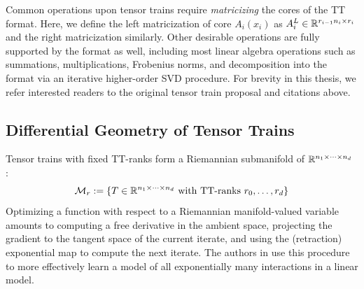 Common operations upon tensor trains require \textit{matricizing} the cores of the TT format. Here, we define the left matricization of core $A_i(x_i)$ as $A_i^L \in \mathbb{R}^{r_{i-1}n_i \times r_i} $ and the right matricization similarly.
Other desirable operations are fully supported by the format as well,
including most linear algebra operations such as summations,
multiplications, Frobenius norms,
and decomposition into the format via an iterative higher-order SVD procedure.
For brevity in this thesis, we refer interested readers
to the original tensor train proposal and citations above.

\subsection{Differential Geometry of Tensor Trains}
Tensor trains with fixed TT-ranks form a Riemannian submanifold of $\mathbb{R}^{n_1 \times \cdots \times n_d}$ \citep{lubich2015time, holtz2012manifolds}:
\begin{align}\label{eq:riem}
	\mathcal{M}_r := \{ T \in \mathbb{R}^{n_1 \times \cdots \times n_d} \text{ with TT-ranks\ } r_0,\ldots,r_d\} 
\end{align}
Optimizing a function with respect to a Riemannian manifold-valued variable amounts to computing a free derivative in the ambient space, projecting the gradient to the tangent space of the current iterate, and using the (retraction) exponential map to compute the next iterate.
The authors in \cite{novikov2016exponential} use this procedure to more effectively learn a model of all exponentially many interactions in a linear model.
